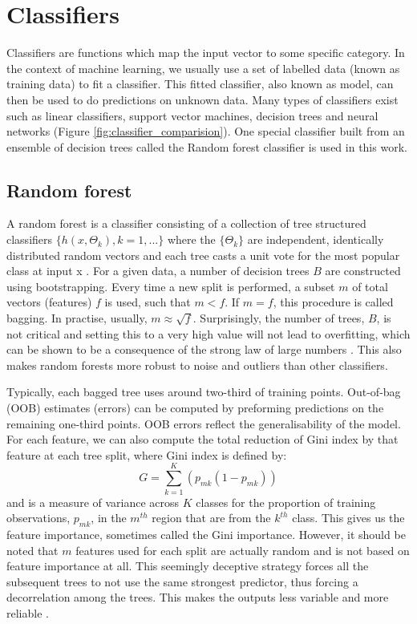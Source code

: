 \section{Classifiers}
Classifiers are functions which map the input vector to some specific category. In the context of machine learning, we usually use a set of labelled data (known as training data) to fit a classifier. This fitted classifier, also known as model, can then be used to do predictions on unknown data. Many types of classifiers exist such as linear classifiers, support vector machines, decision trees and neural networks (Figure \ref{fig:classifier_comparision}). One special classifier built from an ensemble of decision trees called the Random forest classifier is used in this work. 

\subsection{Random forest}
A random forest is a classifier consisting of a collection of tree structured classifiers $\{h(x, \Theta_k), k=1, ...\}$ where the  $\{\Theta_k\}$ are independent, identically distributed random vectors and each tree casts a unit vote for the most popular class at input {x} \cite{breiman2001random}. For a given data, a number of decision trees $B$ are constructed using bootstrapping. Every time a new split is performed, a subset $m$ of total vectors (features) $f$ is used, such that $m < f$. If $m = f$, this procedure is called bagging. In practise, usually, $m \approx \sqrt{f}$. Surprisingly, the number of trees, $B$, is not critical and setting this to a very high value will not lead to overfitting, which can be shown to be a consequence of the strong law of large numbers \cite{james2013introductiontostatlearning, breiman2001random}. This also makes random forests more robust to noise and outliers than other classifiers. 

Typically, each bagged tree uses around two-third of training points. Out-of-bag (OOB) estimates (errors) can be computed by preforming predictions on the remaining one-third points. OOB errors reflect the generalisability of the model. For each feature, we can also compute the total reduction of Gini index by that feature at each tree split, where Gini index is defined by: 
\begin{equation*}
    G = \sum_{k=1}^{K}(p_{mk}(1-p_{mk}))
\end{equation*}
and is a measure of variance across $K$ classes for the proportion of training observations, $p_{mk}$, in the $m^{th}$ region that are from the $k^{th}$ class. This gives us the feature importance, sometimes called the Gini importance. However, it should be noted that $m$ features used for each split are actually random and is not based on feature importance at all. This seemingly deceptive strategy forces all the subsequent trees to not use the same strongest predictor, thus forcing a decorrelation among the trees. This makes the outputs less variable and more reliable \cite{james2013introductiontostatlearning}.

